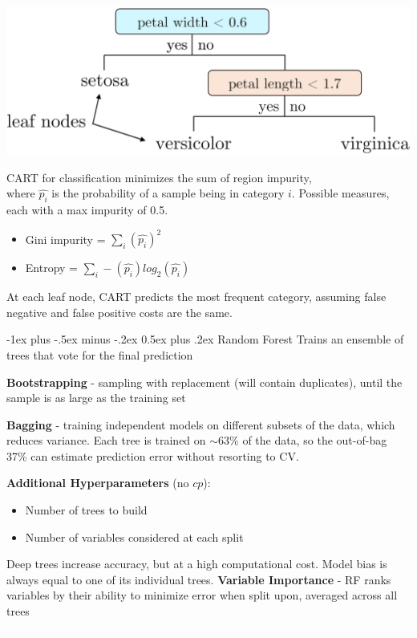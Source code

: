 \documentclass[10pt,landscape]{article}
\makeatletter
\renewcommand{\subsection}{\@startsection{subsection}{2}{0mm}%
                                {-1ex plus -.5ex minus -.2ex}%
                                {0.5ex plus .2ex}%
                                {\normalfont\normalsize\bfseries}}
\makeatother
\begin{document}
\begin{multicols}{3}
\begin{center}
\vspace{-1mm}
    \includegraphics[scale = .09]{images/CART.JPG}
\end{center}
\vspace{-2mm}
CART for classification minimizes the sum of region impurity, \\
where $\hat{p_i}$ is the probability of a sample being in category $i$.
Possible measures, each with a max impurity of 0.5.
\begin{itemize}[label={--},leftmargin=4mm]
\vspace{-1mm}
\itemsep -.4mm 
\item Gini impurity = $\sum_i (\hat{p_i})^2$ 
\item Entropy = $\sum_i -(\hat{p_i}) log_2(\hat{p_i})$ 
\end{itemize}
At each leaf node, CART predicts the most frequent category, assuming false negative and false positive costs are the same.

\subsection{Random Forest}
Trains an ensemble of trees that vote for the final prediction

\textbf{Bootstrapping} - sampling with replacement (will contain duplicates), until the sample is as large as the training set

\textbf{Bagging} - training independent models on different subsets of the data, which reduces variance. Each tree is trained on $\sim$63\% of the data, so the out-of-bag 37\% can estimate prediction error without resorting to CV.  

\textbf{Additional Hyperparameters} (no $cp$):
\begin{itemize}[label={--},leftmargin=4mm]
\vspace{-1mm}
\itemsep -.4mm 
\item Number of trees to build
\item Number of variables considered at each split
\end{itemize}
Deep trees increase accuracy, but at a high computational cost. Model bias is always equal to one of its individual trees.
\textbf{Variable Importance} - RF ranks variables by their ability to minimize error when split upon, averaged across all trees 
\columnbreak
\\\textcolor{white}{.}\vspace{-5mm}\\ %

\end{multicols}
\end{document}
